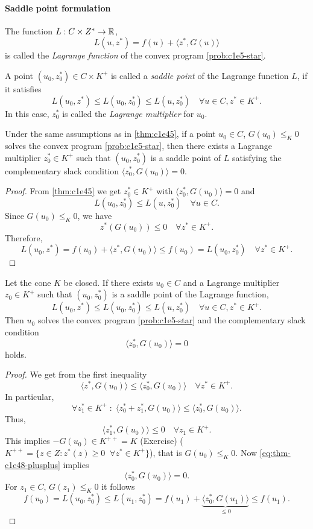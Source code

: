 \documentclass[../skript.tex]{subfiles}
\begin{document}
\paragraph{Saddle point formulation}
\begin{definition} %
\label{def:c1e46}
The function $L : C \times Z^* \to \mathbb{R}$,
\[
	L(u, z^*) = f(u) + \langle z^*, G(u) \rangle
\]
is called the \emph{Lagrange function} of the convex program \cref{prob:c1e5-star}.

A point $(u_0, z_0^*) \in C \times K^+$ is called a \emph{saddle point} of the Lagrange function $L$, if it satisfies
\[
	L(u_0, z^*) \leq L(u_0, z_0^*) \leq L(u, z_0^*) \quad \forall u \in C, z^* \in K^+.
\]
In this case, $z_0^*$ is called the \emph{Lagrange multiplier} for $u_0$.
\end{definition}
\begin{theorem} %
\label{thm:c1e47}
Under the same assumptions as in \cref{thm:c1e45}, if a point $u_0 \in C$, $G(u_0) \leq_K 0$ solves the convex program \cref{prob:c1e5-star}, then there exists a Lagrange multiplier $z_0^* \in K^+$ such that $(u_0, z_0^*)$ is a saddle point of $L$ satisfying the complementary slack condition $\langle z_0^*, G(u_0) \rangle = 0$.
\end{theorem}
\begin{proof}
From \cref{thm:c1e45} we get $z_0^* \in K^+$ with $\langle z_0^*, G(u_0) \rangle = 0$ and
\[
	L(u_0, z_0^*) \leq L(u, z_0^*) \quad \forall u \in C.
\]
Since $G(u_0) \leq_K 0$, we have 
\[
	z^*(G(u_0)) \leq 0 \quad \forall z^* \in K^+.
\]
Therefore,
\[
	L(u_0, z^*) = f(u_0) + \langle z^*, G(u_0) \rangle \leq f(u_0) = L(u_0, z_0^*) \quad \forall z^* \in K^+.
\]
\end{proof}
\begin{theorem} %
\label{thm:c1e48}
Let the cone $K$ be closed. If there exists $u_0 \in C$ and a Lagrange multiplier $z_0 \in K^+$ such that $(u_0, z_0^*)$ is a saddle point of the Lagrange function,
\[
	L(u_0, z^*) \leq L(u_0, z_0^*) \leq L(u, z_0^*) \quad \forall u \in C, z^* \in K^+.
\]
Then $u_0$ solves the convex program \cref{prob:c1e5-star} and the complementary slack condition
\[
	\langle z^*_0, G(u_0) \rangle = 0
\]
holds.
\end{theorem}
\begin{proof}
We get from the first inequality
\begin{equation}
\tag{++}
\label{eq:thm-c1e48-plusplus}
\langle z^*, G(u_0) \rangle \leq \langle z_0^*, G(u_0) \rangle \quad \forall z^* \in K^+.
\end{equation}
In particular,
\[
	\forall z_1^* \in K^+ \; : \; \langle z_0^* + z_1^*, G(u_0) \rangle \leq \langle z_0^*, G(u_0) \rangle.
\]
Thus,
\[
	\langle z_1^*, G(u_0) \rangle \leq 0 \quad \forall z_1 \in K^+.
\]
This implies $-G(u_0) \in K^{++} = K$ (Exercise) ($K^{++} = \{ z \in Z : z^*(z) \geq 0 \;\; \forall z^* \in K^+\}$),
that is $G(u_0) \leq_K 0$. Now \cref{eq:thm-c1e48-plusplus} implies
\[
	\langle z_0^*, G(u_0) \rangle = 0.
\]
For $z_1 \in C$, $G(z_1) \leq_K 0$ it follows
\[
	f(u_0) = L(u_0, z_0^*) \leq L(u_1, z_0^*) = f(u_1) + \underbrace{ \langle z_0^*, G(u_1) \rangle }_{\leq 0} \leq f(u_1).
\]
\end{proof}
\end{document}
